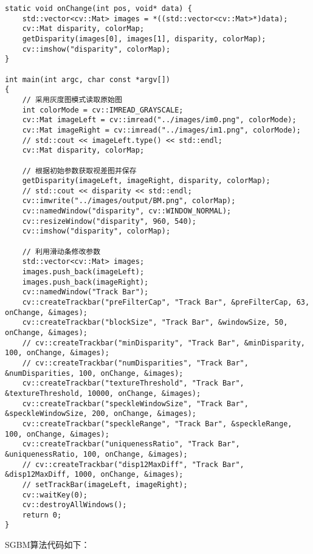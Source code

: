\documentclass[10.5pt, a4paper]{article}
\begin{document}
\begin{lstlisting}
static void onChange(int pos, void* data) {
    std::vector<cv::Mat> images = *((std::vector<cv::Mat>*)data);
    cv::Mat disparity, colorMap;
    getDisparity(images[0], images[1], disparity, colorMap);
    cv::imshow("disparity", colorMap);
}

int main(int argc, char const *argv[])
{
    // 采用灰度图模式读取原始图
    int colorMode = cv::IMREAD_GRAYSCALE;
    cv::Mat imageLeft = cv::imread("../images/im0.png", colorMode);
    cv::Mat imageRight = cv::imread("../images/im1.png", colorMode);
    // std::cout << imageLeft.type() << std::endl;
    cv::Mat disparity, colorMap;

    // 根据初始参数获取视差图并保存
    getDisparity(imageLeft, imageRight, disparity, colorMap);
    // std::cout << disparity << std::endl;
    cv::imwrite("../images/output/BM.png", colorMap);
    cv::namedWindow("disparity", cv::WINDOW_NORMAL);
    cv::resizeWindow("disparity", 960, 540);
    cv::imshow("disparity", colorMap);

    // 利用滑动条修改参数
    std::vector<cv::Mat> images;
    images.push_back(imageLeft);
    images.push_back(imageRight);
    cv::namedWindow("Track Bar");
    cv::createTrackbar("preFilterCap", "Track Bar", &preFilterCap, 63, onChange, &images);
    cv::createTrackbar("blockSize", "Track Bar", &windowSize, 50, onChange, &images);
    // cv::createTrackbar("minDisparity", "Track Bar", &minDisparity, 100, onChange, &images);
    // cv::createTrackbar("numDisparities", "Track Bar", &numDisparities, 100, onChange, &images);
    cv::createTrackbar("textureThreshold", "Track Bar", &textureThreshold, 10000, onChange, &images);
    cv::createTrackbar("speckleWindowSize", "Track Bar", &speckleWindowSize, 200, onChange, &images);
    cv::createTrackbar("speckleRange", "Track Bar", &speckleRange, 100, onChange, &images);
    cv::createTrackbar("uniquenessRatio", "Track Bar", &uniquenessRatio, 100, onChange, &images);
    // cv::createTrackbar("disp12MaxDiff", "Track Bar", &disp12MaxDiff, 1000, onChange, &images);
    // setTrackBar(imageLeft, imageRight);
    cv::waitKey(0);
    cv::destroyAllWindows();
    return 0;
}

\end{lstlisting}
SGBM算法代码如下：
\end{document}
